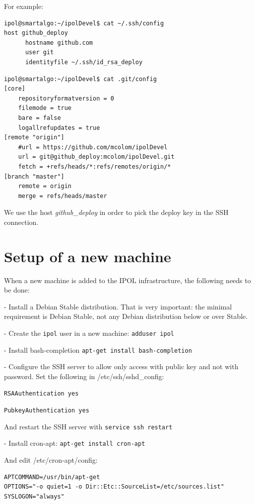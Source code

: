 \documentclass[a4paper,12pt]{article}
\begin{document}
For example:

\begin{verbatim}
ipol@smartalgo:~/ipolDevel$ cat ~/.ssh/config
host github_deploy
      hostname github.com
      user git
      identityfile ~/.ssh/id_rsa_deploy
\end{verbatim}

\vspace{0.15cm}

\begin{verbatim}
ipol@smartalgo:~/ipolDevel$ cat .git/config
[core]
	repositoryformatversion = 0
	filemode = true
	bare = false
	logallrefupdates = true
[remote "origin"]
	#url = https://github.com/mcolom/ipolDevel
	url = git@github_deploy:mcolom/ipolDevel.git
	fetch = +refs/heads/*:refs/remotes/origin/*
[branch "master"]
	remote = origin
	merge = refs/heads/master
\end{verbatim}

We use the host \emph{github\_deploy} in order to pick the deploy key in the SSH connection.

\section{Setup of a new machine}
When a new machine is added to the IPOL infrastructure, the following needs to be done:

- Install a Debian Stable distribution. That is very important: the minimal requirement is Debian Stable, not any Debian distribution below or over Stable.

- Create the {\tt ipol} user in a new machine: {\tt adduser ipol}

- Install bash-completion {\tt apt-get install bash-completion}

- Configure the SSH server to allow only access with public key and not with password. Set the following in /etc/ssh/sshd\_config:

{\tt RSAAuthentication yes}

{\tt PubkeyAuthentication yes}

And restart the SSH server with {\tt service ssh restart}

- Install cron-apt: {\tt apt-get install cron-apt}

And edit /etc/cron-apt/config:
\begin{verbatim}
APTCOMMAND=/usr/bin/apt-get
OPTIONS="-o quiet=1 -o Dir::Etc::SourceList=/etc/sources.list"
SYSLOGON="always"
\end{verbatim}
\end{document}
